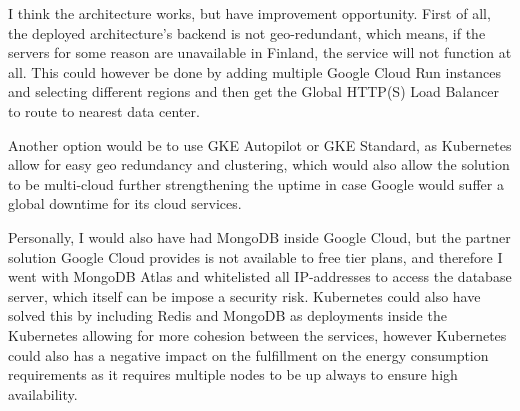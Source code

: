 \documentclass[11pt]{article}
\begin{document}
I think the architecture works, but have improvement opportunity. First of all, the deployed architecture's backend is not geo-redundant, which means, if the servers for some reason are unavailable in Finland, the service will not function at all. This could however be done by adding multiple Google Cloud Run instances and selecting different regions and then get the Global HTTP(S) Load Balancer to route to nearest data center.

Another option would be to use GKE Autopilot or GKE Standard, as Kubernetes allow for easy geo redundancy and clustering, which would also allow the solution to be multi-cloud further strengthening the uptime in case Google would suffer a global downtime for its cloud services.

Personally, I would also have had MongoDB inside Google Cloud, but the partner solution Google Cloud provides is not available to free tier plans, and therefore I went with MongoDB Atlas and whitelisted all IP-addresses to access the database server, which itself can be impose a security risk. Kubernetes could also have solved this by including Redis and MongoDB as deployments inside the Kubernetes allowing for more cohesion between the services, however Kubernetes could also has a negative impact on the fulfillment on the energy consumption requirements as it requires multiple nodes to be up always to ensure high availability.

\newpage
\listoffigures
\end{document}
